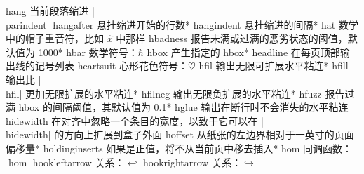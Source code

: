 \capcs hang {当前段落缩进 |\\parindent|}{}{}
\capcs hangafter {悬挂缩进开始的行数}*{}
\capcs hangindent {悬挂缩进的间隔}*{}
\capcs hat {数学中的帽子重音符，比如 $\hat x$ 中那样}{}{}
\capcs hbadness {报告未满或过满的恶劣状态的阈值，默认值为 1000}*{}
\capcs hbar {数学符号：$\hbar$}{}{}
\capcs hbox {产生指定的 hbox}*{}
\capcs headline {在每页顶部输出线的记号列表}{}{}
\capcs heartsuit {心形花色符号：$\heartsuit$}{}{}
\capcs hfil {输出无限可扩展水平粘连}*{}
\capcs hfill {输出比 |\\hfil| 更加无限扩展的水平粘连}*{}
\capcs hfilneg {输出无限负扩展的水平粘连}*{}
\capcs hfuzz {报告过满 hbox 的间隔阈值，其默认值为 0.1\pt}*{}
\capcs hglue {输出在断行时不会消失的水平粘连}{}{}
\capcs hidewidth {在对齐中忽略一个条目的宽度，以致于它可以在 |\\hidewidth| 的方向上扩展到盒子外面}{}{}
\capcs hoffset {从纸张的左边界相对于一英寸的页面偏移量}*{}
\capcs holdinginserts {如果是正值，将不从当前页中移去插入}*{}
\capcs hom {同调函数：$\hom$}{}{}
\capcs hookleftarrow {关系：$\hookleftarrow$}{}{}
\capcs hookrightarrow {关系：$\hookrightarrow$}{}{}
